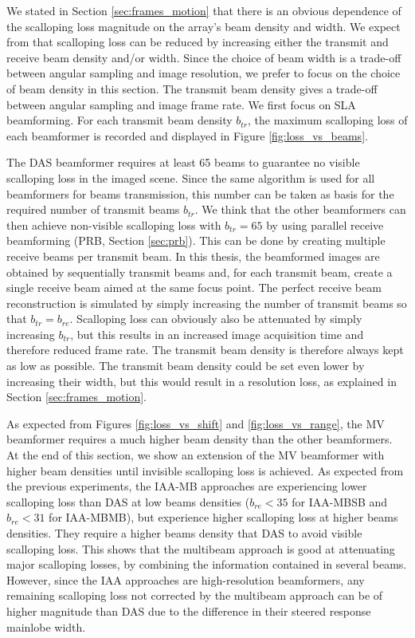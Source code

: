 We stated in Section \ref{sec:frames_motion} that there is an obvious dependence of the scalloping loss magnitude on the array's beam density and width.
We expect from \cite{Asen_shift_invariance} that scalloping loss can be reduced by increasing either the transmit and receive beam density and/or width.
Since the choice of beam width is a trade-off between angular sampling and image resolution, we prefer to focus on the choice of beam density in this section.
The transmit beam density gives a trade-off between angular sampling and image frame rate. We first focus on SLA beamforming.
For each transmit beam density $b_{tr}$, the maximum scalloping loss of each beamformer is recorded and displayed in Figure \ref{fig:loss_vs_beams}.

The DAS beamformer requires at least 65 beams to guarantee no visible scalloping loss in the imaged scene. Since the same algorithm is used for all beamformers for beams transmission, this number can be taken as basis for the required number of transmit beams $b_{tr}$. We think that the other beamformers can then achieve non-visible scalloping loss with $b_{tr} = 65$ by using parallel receive beamforming (PRB, Section \ref{sec:prb}). This can be done by creating multiple receive beams per transmit beam.
In this thesis, the beamformed images are obtained by sequentially transmit beams and, for each transmit beam, create a single receive beam aimed at the same focus point.
The perfect receive beam reconstruction is simulated by simply increasing the number of transmit beams so that $b_{tr} = b_{re}$.
Scalloping loss can obviously also be attenuated by simply increasing $b_{tr}$, but this results in an increased image acquisition time and therefore reduced frame rate. The transmit beam density is therefore always kept as low as possible.
The transmit beam density could be set even lower by increasing their width, but this would result in a resolution loss, as explained in Section \ref{sec:frames_motion}. 

As expected from Figures \ref{fig:loss_vs_shift} and \ref{fig:loss_vs_range}, the MV beamformer requires a much higher beam density than the other beamformers.
At the end of this section, we show an extension of the MV beamformer with higher beam densities until invisible scalloping loss is achieved.
As expected from the previous experiments, the IAA-MB approaches are experiencing lower scalloping loss than DAS at low beams densities ($b_{re} < 35$ for IAA-MBSB and $b_{re} < 31$ for IAA-MBMB), but experience higher scalloping loss at higher beams densities. They require a higher beams density that DAS to avoid visible scalloping loss. This shows that the multibeam approach is good at attenuating major scalloping losses, by combining the information contained in several beams. However, since the IAA approaches are high-resolution beamformers, any remaining scalloping loss not corrected by the multibeam approach can be of higher magnitude than DAS due to the difference in their steered response mainlobe width.

